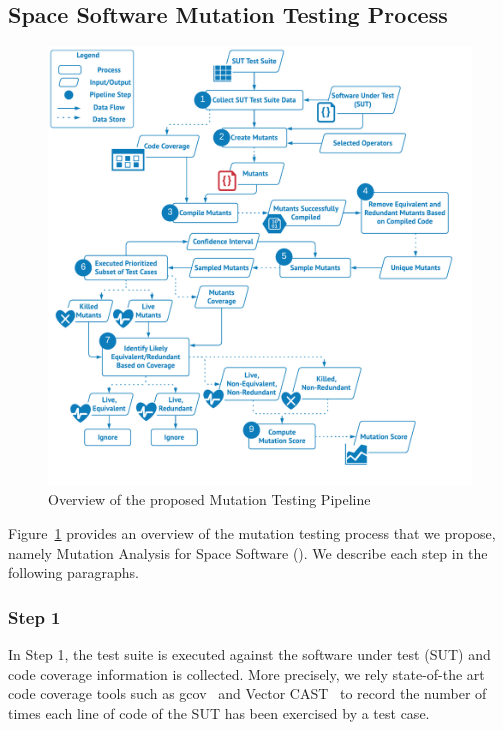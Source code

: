 \subsection{Space Software Mutation Testing Process}
\label{sec:approach}

\begin{figure}[h!]
\begin{center}
\includegraphics[width=\textwidth]{images/MT}
\caption{Overview of the proposed Mutation Testing Pipeline}
\label{fig:approach}
\end{center}
\end{figure}

Figure~\ref{fig:approach} provides an overview of the mutation testing process that we propose, namely Mutation Analysis for Space Software  (\APPR). We describe each step in the following paragraphs. 

\subsubsection{Step 1}

In Step 1, the test suite is executed against the software under test (SUT) and code coverage information is collected. 
More precisely, we rely state-of-the art code coverage tools such as gcov~\cite{GCOV} and Vector CAST~\cite{VectorCAST} 
to record the number of times each line of code of the SUT has been exercised by a test case.

